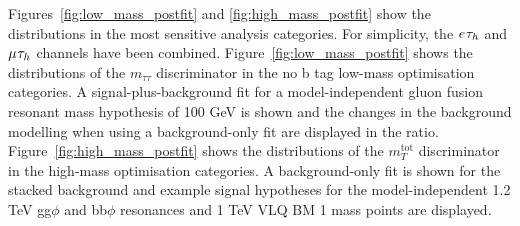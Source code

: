 Figures~\ref{fig:low_mass_postfit} and \ref{fig:high_mass_postfit} show the distributions in the most sensitive analysis categories.
For simplicity, the $e_{}\tau_{h}$ and $\mu_{}\tau_{h}$ channels have been combined.
Figure~\ref{fig:low_mass_postfit} shows the distributions of the $m_{\tau\tau}$ discriminator in the no b tag low-mass optimisation categories. 
A signal-plus-background fit for a model-independent gluon fusion resonant mass hypothesis of 100 GeV is shown and the changes in the background modelling when using a background-only fit are displayed in the ratio.
Figure~\ref{fig:high_mass_postfit} shows the distributions of the $m_{T}^{\text{tot}}$ discriminator in the high-mass optimisation categories.
A background-only fit is shown for the stacked background and example signal hypotheses for the model-independent 1.2 TeV gg$\phi$ and bb$\phi$ resonances and 1 TeV VLQ BM 1 mass points are displayed. \\

